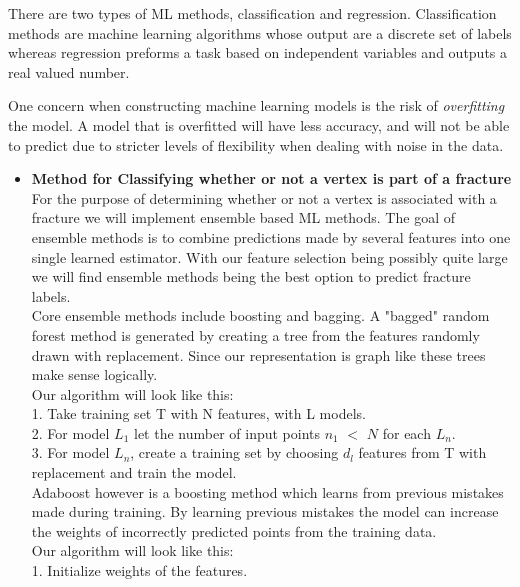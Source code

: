 \begin{itemize}
There are two types of ML methods, classification and regression. Classification methods are machine learning algorithms whose output are a discrete set of labels whereas regression preforms a task based on independent variables and outputs a real valued number. 

One concern when constructing machine learning models is the risk of \textit{overfitting} the model. A model that is overfitted will have less accuracy, and will not be able to predict due to stricter levels of flexibility when dealing with noise in the data. 




\begin{itemize}
\bigskip
\item \textbf{Method for Classifying whether or not a vertex is part of a fracture}
\bigskip
\\
For the purpose of determining whether or not a vertex is associated with a fracture we will implement ensemble based ML methods. The goal of ensemble methods is to combine predictions made by several features into one single learned estimator. With our feature selection being possibly quite large we will find ensemble methods being the best option to predict fracture labels. 
\bigskip
\\
Core ensemble methods include boosting and bagging. A "bagged" random forest method is generated by creating a tree from the features randomly drawn with replacement. Since our representation is graph like these trees make sense logically. 
\bigskip
\\
Our algorithm will look like this:
\\
1. Take training set T with N features, with L models.
\\
2. For model $L _{1}$ let the number of input points $n_{1}$ $<$ $N$ for each $L_{n}$.
\\
3. For model $L_{n}$, create a training set by choosing $d_{l}$ features from T with replacement and train the model.
\bigskip
\\
Adaboost however is a boosting method which learns from previous mistakes made during training. By learning previous mistakes the model can increase the weights of incorrectly predicted points from the training data. 
\bigskip
\\
Our algorithm will look like this:
\\
1. Initialize weights of the features. 

\end{itemize}
\end{itemize}
